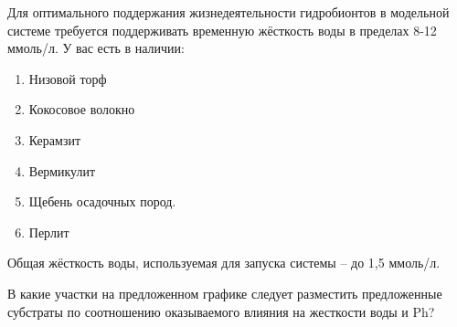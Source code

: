 
Для оптимального поддержания жизнедеятельности гидробионтов в модельной системе требуется поддерживать временную жёсткость воды в пределах 8-12 ммоль/л. У вас есть в наличии:

\begin{enumerate}
    \item Низовой торф
    \item Кокосовое волокно
    \item Керамзит
    \item Вермикулит
    \item Щебень осадочных пород. 
    \item Перлит 
\end{enumerate}

Общая жёсткость воды, используемая для запуска системы – до 1,5 ммоль/л.

В какие участки на предложенном графике следует разместить предложенные субстраты по соотношению оказываемого влияния на жесткости воды и Ph?

